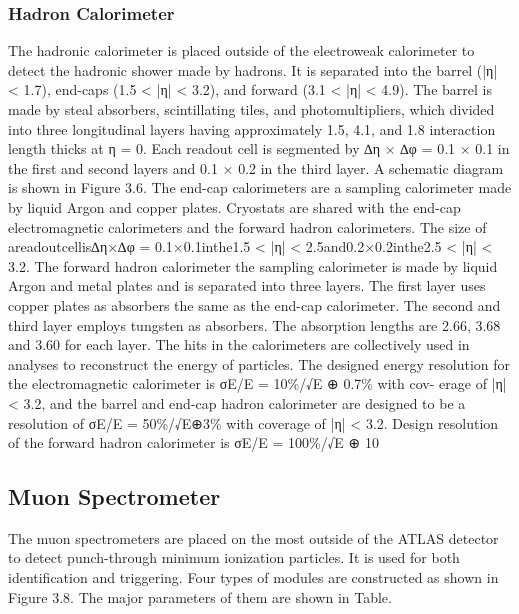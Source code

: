 \subsubsection{Hadron Calorimeter}
The hadronic calorimeter is placed outside of the electroweak calorimeter to detect the hadronic shower made by hadrons. It is separated into the barrel (|η| < 1.7), end-caps (1.5 < |η| < 3.2), and forward (3.1 < |η| < 4.9). The barrel is made by steal absorbers, scintillating tiles, and photomultipliers, which divided into three longitudinal layers having approximately 1.5, 4.1, and 1.8 interaction length thicks at η = 0. Each readout cell is segmented by ∆η × ∆φ = 0.1 × 0.1 in the first and second layers and 0.1 × 0.2 in the third layer. A schematic diagram is shown in Figure 3.6. The end-cap calorimeters are a sampling calorimeter made by liquid Argon and copper plates. Cryostats are shared with the end-cap electromagnetic calorimeters and the forward hadron calorimeters. The size of areadoutcellis∆η×∆φ = 0.1×0.1inthe1.5 < |η| < 2.5and0.2×0.2inthe2.5 < |η| < 3.2. The forward hadron calorimeter the sampling calorimeter is made by liquid Argon and metal plates and is separated into three layers. The first layer uses copper plates as absorbers the same as the end-cap calorimeter. The second and third layer employs tungsten as absorbers. The absorption lengths are 2.66, 3.68 and 3.60 for each layer.
The hits in the calorimeters are collectively used in analyses to reconstruct the energy of particles. The designed energy resolution for the electromagnetic calorimeter is σE/E = 10\%/√E ⊕ 0.7\% with cov- erage of |η| < 3.2, and the barrel and end-cap hadron calorimeter are designed to be a resolution of σE/E = 50\%/√E⊕3\% with coverage of |η| < 3.2. Design resolution of the forward hadron calorimeter is σE/E = 100\%/√E ⊕ 10%
\subsection{Muon Spectrometer}
The muon spectrometers are placed on the most outside of the ATLAS detector to detect punch-through minimum ionization particles. It is used for both identification and triggering. Four types of modules are constructed as shown in Figure 3.8. The major parameters of them are shown in Table.
